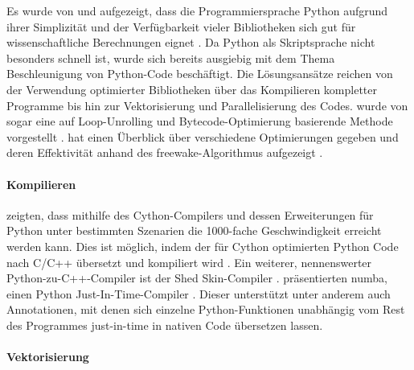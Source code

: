 Es wurde von \citeauthor{Oli07} und \citeauthor{PGH11} aufgezeigt, dass die Programmiersprache Python aufgrund ihrer Simplizität und der Verfügbarkeit vieler Bibliotheken sich gut für wissenschaftliche Berechnungen eignet \cite{Oli07,PGH11}. Da Python als Skriptsprache nicht besonders schnell ist, wurde sich bereits ausgiebig mit dem Thema Beschleunigung von Python-Code beschäftigt. Die Lösungsansätze reichen von der Verwendung optimierter Bibliotheken über das Kompilieren kompletter Programme bis hin zur Vektorisierung und Parallelisierung des Codes. \citeyear{BR09} wurde von \citeauthor{BR09} sogar eine auf Loop-Unrolling und Bytecode-Optimierung basierende Methode vorgestellt \cite{BR09}. \citeauthor{Ill14} hat \citeyear{Ill14} einen Überblick über verschiedene Optimierungen gegeben und deren Effektivität anhand des freewake-Algorithmus aufgezeigt \cite{Ill14}.

\paragraph{Kompilieren}

\citeauthor{BBC+11} zeigten, dass mithilfe des Cython-Compilers und dessen Erweiterungen für Python unter bestimmten Szenarien die 1000-fache Geschwindigkeit erreicht werden kann. Dies ist möglich, indem der für Cython optimierten Python Code nach C/C++ übersetzt und kompiliert wird \cite{BBC+11}. Ein weiterer, nennenswerter Python-zu-C++-Compiler ist der Shed Skin-Compiler \cite{Mar09}. \citeauthor{LPS15} präsentierten \citeyear{LPS15} numba, einen Python Just-In-Time-Compiler \cite{LPS15}. Dieser unterstützt unter anderem auch Annotationen, mit denen sich einzelne Python-Funktionen unabhängig vom Rest des Programmes just-in-time in nativen Code übersetzen lassen. 

\paragraph{Vektorisierung}

